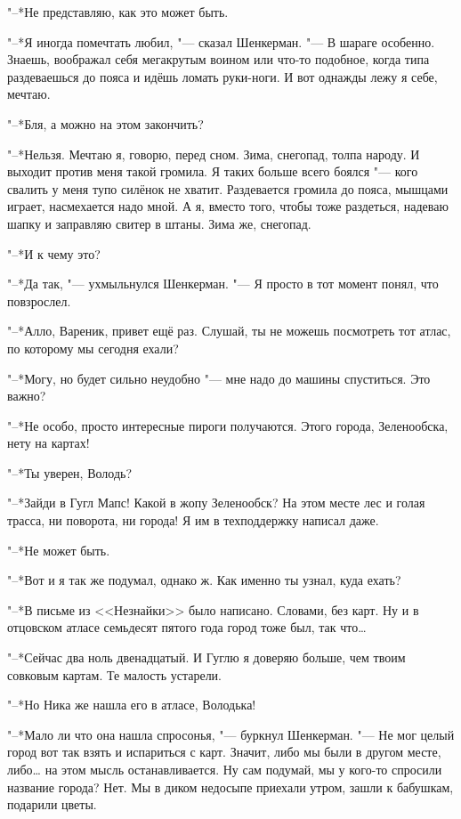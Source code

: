 "--*Не представляю, как это может быть.

"--*Я иногда помечтать любил, "--- сказал Шенкерман.
"--- В шараге особенно.
Знаешь, воображал себя мегакрутым воином или что-то подобное, когда типа раздеваешься до пояса и идёшь ломать руки-ноги.
И вот однажды лежу я себе, мечтаю.

"--*Бля, а можно на этом закончить?

"--*Нельзя.
Мечтаю я, говорю, перед сном.
Зима, снегопад, толпа народу.
И выходит против меня такой громила.
Я таких больше всего боялся "--- кого свалить у меня тупо силёнок не хватит.
Раздевается громила до пояса, мышцами играет, насмехается надо мной.
А я, вместо того, чтобы тоже раздеться, надеваю шапку и заправляю свитер в штаны.
Зима же, снегопад.

"--*И к чему это?

"--*Да так, "--- ухмыльнулся Шенкерман.
"--- Я просто в тот момент понял, что повзрослел.

\asterism

"--*Алло, Вареник, привет ещё раз.
Слушай, ты не можешь посмотреть тот атлас, по которому мы сегодня ехали?

"--*Могу, но будет сильно неудобно "--- мне надо до машины спуститься.
Это важно?

"--*Не особо, просто интересные пироги получаются.
Этого города, Зеленообска, нету на картах!

"--*Ты уверен, Володь?

"--*Зайди в Гугл Мапс!
Какой в жопу Зеленообск?
На этом месте лес и голая трасса, ни поворота, ни города!
Я им в техподдержку написал даже.

"--*Не может быть.

"--*Вот и я так же подумал, однако ж.
Как именно ты узнал, куда ехать?

"--*В письме из <<Незнайки>> было написано.
Словами, без карт.
Ну и в отцовском атласе семьдесят пятого года город тоже был, так что\ldots{}

"--*Сейчас два ноль двенадцатый.
И Гуглю я доверяю больше, чем твоим совковым картам.
Те малость устарели.

"--*Но Ника же нашла его в атласе, Володька!

"--*Мало ли что она нашла спросонья, "--- буркнул Шенкерман.
"--- Не мог целый город вот так взять и испариться с карт.
Значит, либо мы были в другом месте, либо\ldots{} на этом мысль останавливается.
Ну сам подумай, мы у кого-то спросили название города?
Нет.
Мы в диком недосыпе приехали утром, зашли к бабушкам, подарили цветы.

